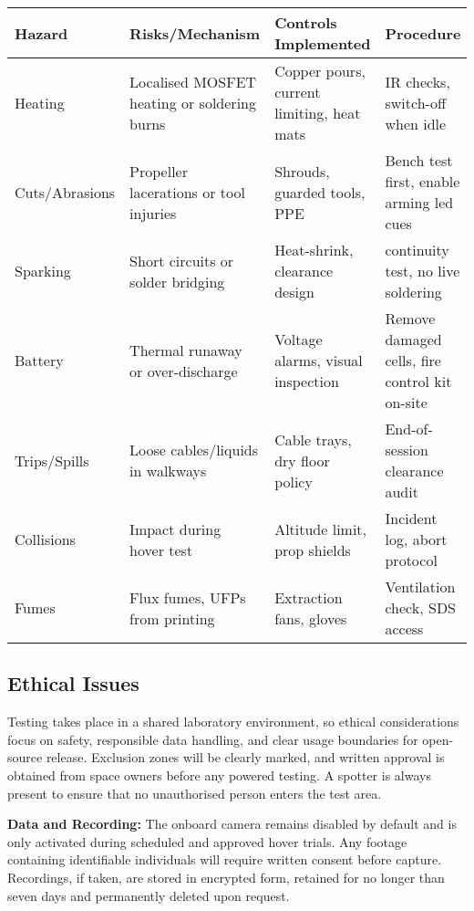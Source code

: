 \begin{tabular}{|p{2.3cm}|p{4.5cm}|p{4cm}|p{3.8cm}|}
\hline
\rowcolor{gray!15}\textbf{Hazard} & \textbf{Risks/Mechanism} & \textbf{Controls Implemented} & \textbf{Procedure} \\ \hline
Heating & Localised MOSFET heating or soldering burns & Copper pours, current limiting, heat mats & IR checks, switch-off when idle \\ \hline
Cuts/Abrasions & Propeller lacerations or tool injuries & Shrouds, guarded tools, PPE & Bench test first, enable arming \gls{led} cues \\ \hline
Sparking & Short circuits or solder bridging & Heat-shrink, clearance design & continuity test, no live soldering \\ \hline
Battery & Thermal runaway or over-discharge & Voltage alarms, visual inspection & Remove damaged cells, fire control kit on-site \\ \hline
Trips/Spills & Loose cables/liquids in walkways & Cable trays, dry floor policy & End-of-session clearance audit \\ \hline
Collisions & Impact during hover test & Altitude limit, prop shields & Incident log, abort protocol \\ \hline
Fumes & Flux fumes, UFPs from printing & Extraction fans, gloves & Ventilation check, SDS access \\ \hline
\end{tabular}

\pagebreak
\subsection{Ethical Issues}
Testing takes place in a shared laboratory environment, so ethical considerations focus on safety, responsible data handling, and clear usage boundaries for open-source release. Exclusion zones will be clearly marked, and written approval is obtained from space owners before any powered testing. A spotter is always present to ensure that no unauthorised person enters the test area.

\vspace{0.5em}
\textbf{Data and Recording:}  
The onboard camera remains disabled by default and is only activated during scheduled and approved hover trials. Any footage containing identifiable individuals will require written consent before capture. Recordings, if taken, are stored in encrypted form, retained for no longer than seven days and permanently deleted upon request.

